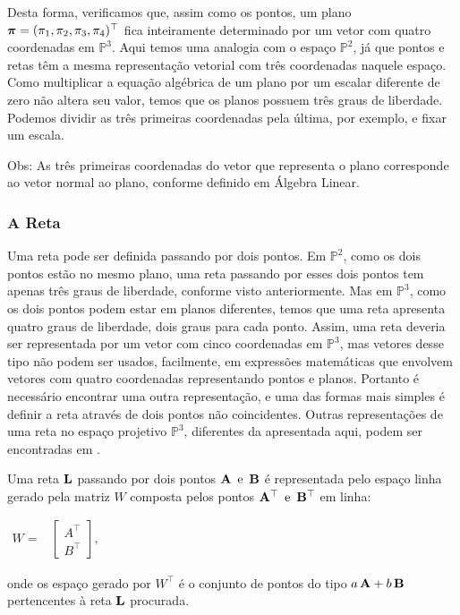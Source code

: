 Desta forma, verificamos que, assim como os pontos, um plano $\boldsymbol{\pi} = (\pi_1,\pi_2,\pi_3,\pi_4)^\top$ fica inteiramente determinado por um vetor com quatro coordenadas em $\mathbb{P}^3$. Aqui temos uma analogia com o espaço $\mathbb{P}^2$, já que pontos e retas têm a mesma representação vetorial com três coordenadas naquele espaço. Como multiplicar a equação algébrica de um plano por um escalar diferente de zero não altera seu valor, temos que os planos possuem três graus de liberdade. Podemos dividir as três primeiras coordenadas pela última, por exemplo, e fixar um escala.

Obs: As três primeiras coordenadas do vetor que representa o plano corresponde ao vetor normal ao plano, conforme definido em Álgebra Linear.
\\


\subsubsection{A Reta}

Uma reta pode ser definida passando por dois pontos. Em $\mathbb{P}^2$, como os dois pontos estão no mesmo plano, uma reta passando por esses dois pontos tem apenas três graus de liberdade, conforme visto anteriormente. Mas em $\mathbb{P}^3$, como os dois pontos podem estar em planos diferentes, temos que uma reta apresenta quatro graus de liberdade, dois graus para cada ponto. Assim, uma reta deveria ser representada por um vetor com cinco coordenadas em $\mathbb{P}^3$, mas vetores desse tipo não podem ser usados, facilmente, em expressões matemáticas que envolvem vetores com quatro coordenadas representando pontos e planos. Portanto é necessário encontrar uma outra representação, e uma das formas mais simples é definir a reta através de dois pontos não coincidentes. Outras representações de uma reta no espaço projetivo $\mathbb{P}^3$, diferentes da apresentada aqui, podem ser encontradas em \cite{Hartley2004}.


Uma reta ${\bf L}$ passando por dois pontos ${\bf A} \,\,\, \text{e} \,\,\, {\bf B}$ é representada pelo espaço linha gerado pela matriz $W$ composta pelos pontos ${\bf A}^\top \,\,\,\text{e} \,\,\, {\bf B}^\top$ em linha:

\begin{center}
$
\begin{array}{cc}
W = 
& \begin{bmatrix}
  A^\top\\
  B^\top
  \end{bmatrix},
\end{array}
$
\end{center}
onde os espaço gerado por $W^\top$ é o conjunto de pontos do tipo $a\,{\bf A} + b\,{\bf B}$ pertencentes à reta ${\bf L}$ procurada. \\


